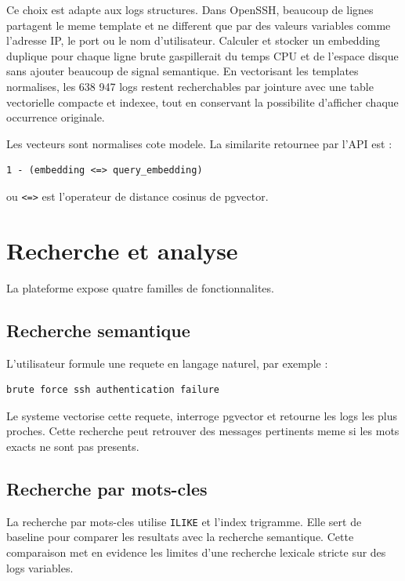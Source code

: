 \documentclass[12pt,a4paper]{article}
\begin{document}
Ce choix est adapte aux logs structures. Dans OpenSSH, beaucoup de lignes partagent le meme template
et ne different que par des valeurs variables comme l'adresse IP, le port ou le nom d'utilisateur.
Calculer et stocker un embedding duplique pour chaque ligne brute gaspillerait du temps CPU et de
l'espace disque sans ajouter beaucoup de signal semantique. En vectorisant les templates
normalises, les 638 947 logs restent recherchables par jointure avec une table vectorielle compacte
et indexee, tout en conservant la possibilite d'afficher chaque occurrence originale.

Les vecteurs sont normalises cote modele. La similarite retournee par l'API est :

\begin{lstlisting}
1 - (embedding <=> query_embedding)
\end{lstlisting}

ou \texttt{<=>} est l'operateur de distance cosinus de pgvector.

\section{Recherche et analyse}

La plateforme expose quatre familles de fonctionnalites.

\subsection{Recherche semantique}

L'utilisateur formule une requete en langage naturel, par exemple :

\begin{lstlisting}
brute force ssh authentication failure
\end{lstlisting}

Le systeme vectorise cette requete, interroge pgvector et retourne les logs les plus proches. Cette
recherche peut retrouver des messages pertinents meme si les mots exacts ne sont pas presents.

\subsection{Recherche par mots-cles}

La recherche par mots-cles utilise \texttt{ILIKE} et l'index trigramme. Elle sert de baseline pour
comparer les resultats avec la recherche semantique. Cette comparaison met en evidence les limites
d'une recherche lexicale stricte sur des logs variables.
\end{document}

